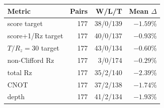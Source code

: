 \begin{tabular}{lrrr}
\toprule
Metric & Pairs & W/L/T & Mean $\Delta$ \\
\midrule
score target & 177 & 38/0/139 & $-1.59\%$ \\
score+1/Rz target & 177 & 40/0/137 & $-0.93\%$ \\
$T/R_z=30$ target & 177 & 43/0/134 & $-0.60\%$ \\
non-Clifford Rz & 177 & 3/0/174 & $-0.29\%$ \\
total Rz & 177 & 35/2/140 & $-2.39\%$ \\
CNOT & 177 & 37/2/138 & $-1.74\%$ \\
depth & 177 & 41/2/134 & $-1.93\%$ \\
\bottomrule
\end{tabular}
